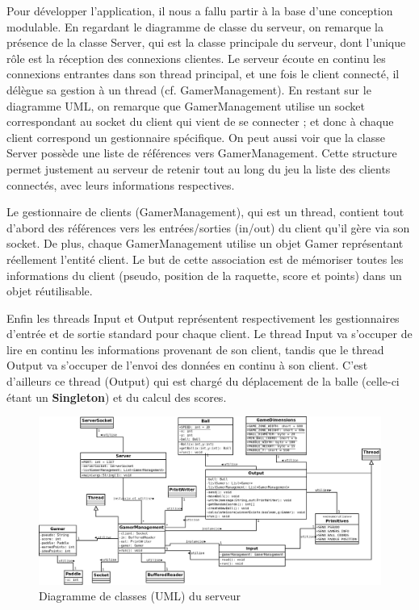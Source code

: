 \documentclass[a4paper,12pt]{article}
\begin{document}
Pour développer l'application, il nous a fallu partir à la base d'une conception modulable. En regardant le diagramme de classe du serveur, on remarque la présence de la classe Server, qui est la classe principale du serveur, dont l'unique rôle est la réception des connexions clientes. Le serveur écoute en continu les connexions entrantes dans son thread principal, et une fois le client connecté, il délègue sa gestion à un thread (cf. GamerManagement). En restant sur le diagramme UML, on remarque que GamerManagement utilise un socket correspondant au socket du client qui vient de se connecter ; et donc à chaque client correspond un gestionnaire spécifique. On peut aussi voir que la classe Server possède une liste de références vers GamerManagement. Cette structure permet justement au serveur de retenir tout au long du jeu la liste des clients connectés, avec leurs informations respectives.

Le gestionnaire de clients (GamerManagement), qui est un thread, contient tout d'abord des références vers les entrées/sorties (in/out) du client qu'il gère via son socket. De plus, chaque GamerManagement utilise un objet Gamer représentant réellement l'entité client. Le but de cette association est de mémoriser toutes les informations du client (pseudo, position de la raquette, score et points) dans un objet réutilisable.

Enfin les threads Input et Output représentent respectivement les gestionnaires d'entrée et de sortie standard pour chaque client. Le thread Input va s'occuper de lire en continu les informations provenant de son client, tandis que le thread Output va s'occuper de l'envoi des données en continu à son client. C'est d'ailleurs ce thread (Output) qui est chargé du déplacement de la balle (celle-ci étant un \textbf{Singleton}) et du calcul des scores.

\begin{landscape}
  \begin{figure}
  \begin{center}
    \includegraphics[scale=.4]{diagramme-serveur.png}
  \end{center}
  \caption{Diagramme de classes (UML) du serveur}
  \end{figure}
\end{landscape}
\end{document}
